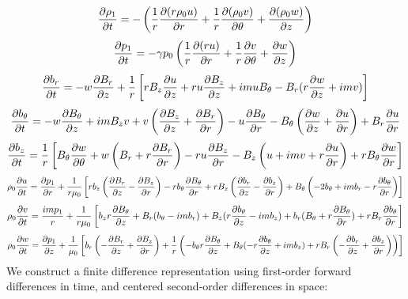 \documentclass[%
 reprint,
 amsmath,amssymb,
 aps,
]{revtex4-2}
\begin{document}
\begin{equation}
\pdv{\rho_1}{t} = - \left( \frac{1}{r} \pdv{( r \rho_0 u)}{r} + \frac{1}{r} \pdv{(\rho_0 v)}{\theta} + \pdv{(\rho_0 w)}{z} \right)
\end{equation}
\begin{equation}
\pdv{p_1}{t} = - \gamma p_0 \left( \frac{1}{r} \pdv{(r u)}{r} + \frac{1}{r} \pdv{v}{\theta}  + \pdv{w}{z}  \right)
\end{equation}
\begin{equation}
\pdv{b_r}{t} = - w \pdv{B_r}{z} + \frac{1}{r} \left[ r B_z \pdv{u}{z} + r u \pdv{B_z}{z} + i m u B_\theta - B_r (r \pdv{w}{z} + i m v) \right]
\end{equation}
\begin{equation}
\pdv{b_\theta}{t} = - w \pdv{B_\theta}{z} + i m B_z v + v \left( \pdv{B_z}{z} + \pdv{B_r}{r} \right) - u \pdv{B_\theta}{r} - B_\theta \left( \pdv{w}{z} + \pdv{u}{r} \right) + B_r \pdv{u}{r}
\end{equation}
\begin{equation}
\pdv{b_z}{t} = \frac{1}{r} \left[ B_\theta \pdv{w}{\theta} + w \left(B_r + r \pdv{B_r}{r} \right) - r u \pdv{B_z}{r} - B_z \left(u + imv + r \pdv{u}{r} \right) + r B_\theta \pdv{w}{r} \right]
\end{equation}
\begin{equation}
\rho_0 \pdv{u}{t} = \pdv{p_1}{r} + \frac{1}{r \mu_0} \left[ r b_z \left( \pdv{B_r}{z} - \pdv{B_z}{r} \right) - r b_\theta \pdv{B_\theta}{r} + r B_z \left( \pdv{b_r}{z} - \pdv{b_z}{r} \right) + B_\theta \left( -2 b_\theta + i m b_r - r \pdv{b_\theta}{r} \right) \right]
\end{equation}
\begin{equation}
\rho_0 \pdv{v}{t} = \frac{i m p_1}{r} + \frac{1}{r \mu_0} \left[ b_z r \pdv{B_\theta}{z} + B_r (b_\theta - i m b_r) + B_z (r \pdv{b_\theta}{z} - i m b_z) + b_r(B_\theta + r \pdv{B_\theta}{r}) + r B_r \pdv{b_\theta}{r} \right]
\end{equation}
\begin{equation}
\rho_0 \pdv{w}{t} = \pdv{p_1}{z} + \frac{1}{\mu_0} \left[ b_r \left( - \pdv{B_r}{z} + \pdv{B_z}{r} \right) + \frac{1}{r} \left( -b_\theta r \pdv{B_\theta}{z} + B_\theta (- r \pdv{b_\theta}{z} + i m b_z) + r B_r \left(- \pdv{b_r}{z} + \pdv{b_z}{r} \right) \right)  \right]
\end{equation}
We construct a finite difference representation using first-order forward differences in time, and centered second-order differences in space:
\end{document}
